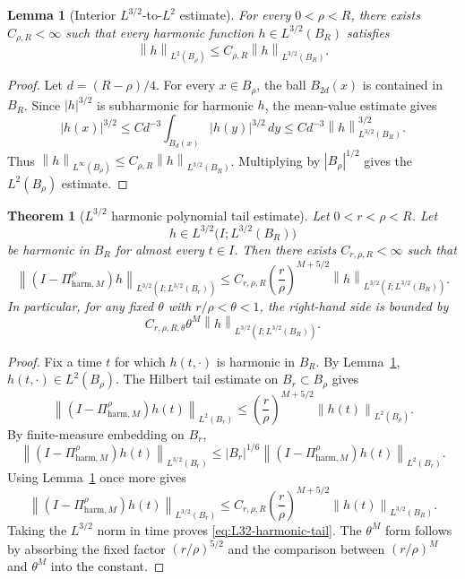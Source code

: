 \documentclass[11pt]{article}
\numberwithin{equation}{section}
\newtheorem{theorem}{Theorem}[section]
\newtheorem{lemma}[lemma]{Lemma}
\theoremstyle{definition}
\theoremstyle{remark}
\newcommand{\harm}{\mathrm{harm}}
\newcommand{\norm}[2]{\left\|#1\right\|_{#2}}
\begin{document}
\begin{lemma}[Interior $L^{3/2}$-to-$L^2$ estimate]\label{lem:L32-L2-interior}
For every $0<\rho<R$, there exists $C_{\rho,R}<\infty$ such that every harmonic function
$h\in L^{3/2}(B_R)$ satisfies
\[
        \norm{h}{L^2(B_\rho)}
        \le
        C_{\rho,R}\norm{h}{L^{3/2}(B_R)}.
\]
\end{lemma}

\begin{proof}
Let $d=(R-\rho)/4$.  For every $x\in B_\rho$, the ball $B_{2d}(x)$ is contained in $B_R$.
Since $|h|^{3/2}$ is subharmonic for harmonic $h$, the mean-value estimate gives
\[
        |h(x)|^{3/2}
        \le
        Cd^{-3}\int_{B_d(x)}|h(y)|^{3/2}\,dy
        \le
        Cd^{-3}\norm{h}{L^{3/2}(B_R)}^{3/2}.
\]
Thus $\norm{h}{L^\infty(B_\rho)}\le C_{\rho,R}\norm{h}{L^{3/2}(B_R)}$.  Multiplying by
$|B_\rho|^{1/2}$ gives the $L^2(B_\rho)$ estimate.
\end{proof}

\begin{theorem}[$L^{3/2}$ harmonic polynomial tail estimate]\label{thm:L32-harmonic-tail}
Let $0<r<\rho<R$.  Let
\[
        h\in L^{3/2}\bigl(I;L^{3/2}(B_R)\bigr)
\]
be harmonic in $B_R$ for almost every $t\in I$.  Then there exists $C_{r,\rho,R}<\infty$
such that
\begin{equation}\label{eq:L32-harmonic-tail}
\norm{(I-\Pi^\rho_{\harm,M})h}{L^{3/2}(I;L^{3/2}(B_r))}
\le
C_{r,\rho,R}
\left(\frac r\rho\right)^{M+5/2}
\norm{h}{L^{3/2}(I;L^{3/2}(B_R))}.
\end{equation}
In particular, for any fixed $\theta$ with $r/\rho<\theta<1$, the right-hand side is bounded by
\[
    C_{r,\rho,R,\theta}\theta^M
    \norm{h}{L^{3/2}(I;L^{3/2}(B_R))}.
\]
\end{theorem}

\begin{proof}
Fix a time $t$ for which $h(t,\cdot)$ is harmonic in $B_R$.  By
Lemma~\ref{lem:L32-L2-interior}, $h(t,\cdot)\in L^2(B_\rho)$.  The Hilbert tail estimate on
$B_r\subset B_\rho$ gives
\[
\norm{(I-\Pi^\rho_{\harm,M})h(t)}{L^2(B_r)}
\le
\left(\frac r\rho\right)^{M+5/2}
\norm{h(t)}{L^2(B_\rho)}.
\]
By finite-measure embedding on $B_r$,
\[
\norm{(I-\Pi^\rho_{\harm,M})h(t)}{L^{3/2}(B_r)}
\le
|B_r|^{1/6}
\norm{(I-\Pi^\rho_{\harm,M})h(t)}{L^2(B_r)}.
\]
Using Lemma~\ref{lem:L32-L2-interior} once more gives
\[
\norm{(I-\Pi^\rho_{\harm,M})h(t)}{L^{3/2}(B_r)}
\le
C_{r,\rho,R}\left(\frac r\rho\right)^{M+5/2}
\norm{h(t)}{L^{3/2}(B_R)}.
\]
Taking the $L^{3/2}$ norm in time proves \eqref{eq:L32-harmonic-tail}.  The $\theta^M$
form follows by absorbing the fixed factor $(r/\rho)^{5/2}$ and the comparison between
$(r/\rho)^M$ and $\theta^M$ into the constant.
\end{proof}
\end{document}
